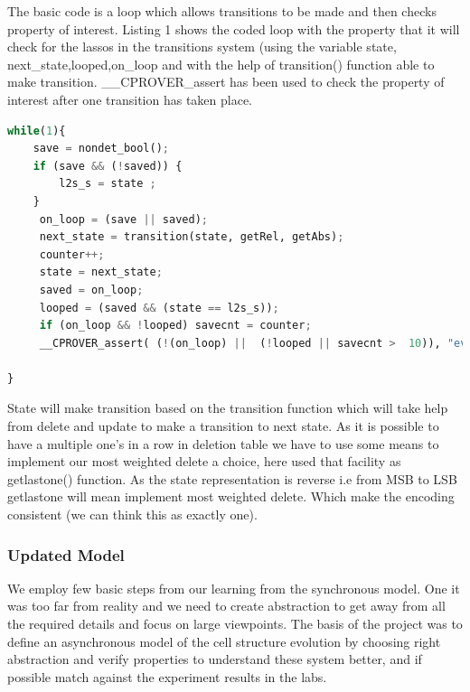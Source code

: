 \documentclass[preprint,12pt]{elsarticle}
\begin{document}
 The basic code is a loop which allows transitions to be made and then checks property of interest. Listing 1 shows the coded loop with the property that it will check for the lassos in the transitions system (using the variable state, next\_state,looped,on\_loop and with the help of transition() function able to make transition. \_\_CPROVER\_assert has been used to check the property of interest after one transition has taken place.   
 \begin{lstlisting}[language=Python,
mathescape,
 breaklines,
  rulecolor=\color{black},
  frame=single,
  caption= \textbf{Basic loop handling the transition with checking the property after one update.}
]
while(1){					   		 
    save = nondet_bool(); 			     
    if (save && (!saved)) {
        l2s_s = state ;           
    }	
     on_loop = (save || saved);			
     next_state = transition(state, getRel, getAbs);
     counter++;
     state = next_state;
     saved = on_loop;  
     looped = (saved && (state == l2s_s));
     if (on_loop && !looped) savecnt = counter;  
     __CPROVER_assert( (!(on_loop) ||  (!looped || savecnt >  10)), "every stable state is reached within 10 iterations");

}
\end{lstlisting}

 State will make transition based on the transition function which will take help from delete and update to make a transition  to next state. As it is possible to have a multiple one's in a row in deletion table we have to use some means to implement our most weighted delete a choice, here used that facility as getlastone() function. As the state representation is reverse i.e from MSB to LSB getlastone will mean implement most weighted delete. Which make the encoding consistent (we can think this as exactly one).

\subsubsection{Updated Model}
We employ few basic steps from our learning from the synchronous model. One it was too far from reality and we need to create abstraction to get away from all the required details and focus on large viewpoints. The basis of the project was to define an asynchronous model of the cell structure evolution by choosing right abstraction and verify properties to understand these system better, and if possible match against the experiment results in the labs. 
\end{document}
